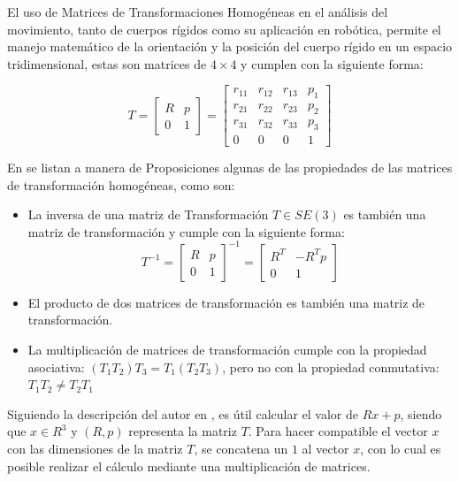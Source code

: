 El uso de Matrices de Transformaciones Homogéneas en el análisis del movimiento, tanto de cuerpos rígidos como su aplicación en robótica, permite el manejo matemático de la orientación y la posición del cuerpo rígido en un espacio tridimensional, estas son matrices de $4 \times 4$ y cumplen con la siguiente forma:



\begin{equation*}
	T = 
    \begin{bmatrix}
	R & p\\
	0 & 1 
	\end{bmatrix} = 
    \begin{bmatrix}
	r_{11} & r_{12} & r_{13} & p_{1}\\
	r_{21} & r_{22} & r_{23} & p_{2}\\
	r_{31} & r_{32} & r_{33} & p_{3}\\
	0 & 0 & 0 & 1 
	\end{bmatrix}
\end{equation*}

En \cite{lynch_modern_2017} se listan a manera de Proposiciones algunas de las propiedades de las matrices de transformación homogéneas, como son:


\begin{itemize}
    \item La inversa de una matriz de Transformación $T \in SE(3)$ es también una matriz de transformación y cumple con la siguiente forma:
    \begin{equation*}
        T^{-1} = 
    \begin{bmatrix}
	R & p\\
	0 & 1 
	\end{bmatrix}^{-1} = 
    \begin{bmatrix}
	R^{T} & -R^{T}p\\
	0 & 1 
	\end{bmatrix}
    \end{equation*}
    \item El producto de dos matrices de transformación es también una matriz de transformación.
    \item La multiplicación de matrices de transformación cumple con la propiedad asociativa: $(T_{1}T_{2})T_{3}=T_{1}(T_{2}T_{3})$, pero no con la propiedad conmutativa: $T_{1}T_{2}\neq T_{2}T_{1}$  
\end{itemize}

Siguiendo la descripción del autor en \cite{lynch_modern_2017}, es útil calcular el valor de $Rx+p$, siendo que $x \in R^{3}$ y $(R,p)$ representa la matriz $T$. Para hacer compatible el vector $x$ con las dimensiones de la matriz $T$, se concatena un $1$ al vector $x$, con lo cual es posible realizar el cálculo mediante una multiplicación de matrices.


